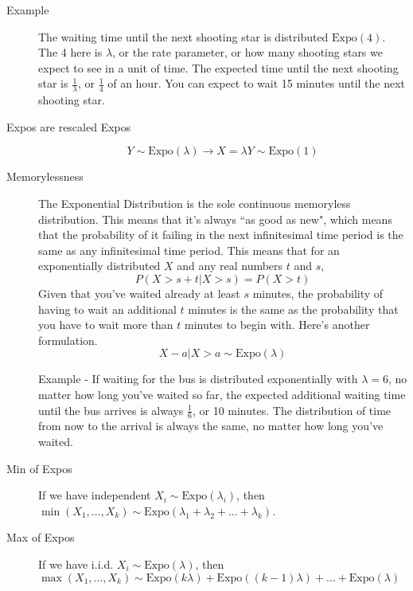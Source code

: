 \documentclass[10pt,landscape]{article}
\newcommand{\Expo}{\textrm{Expo}}
\begin{document}
\begin{multicols}{3}
\begin{description}
    \item[Example] The waiting time until the next shooting star is distributed $\Expo(4)$. The 4 here is $\lambda$, or the rate parameter, or how many shooting stars we expect to see in a unit of time. The expected time until the next shooting star is $\frac{1}{\lambda}$, or $\frac{1}{4}$ of an hour. You can expect to wait 15 minutes until the next shooting star.
    
    \item[Expos are rescaled Expos]
        \[Y \sim \Expo(\lambda) \rightarrow X = \lambda Y \sim \Expo(1)\]
     
    
    \item[Memorylessness] The Exponential Distribution is the sole continuous memoryless distribution. This means that it's always ``as good as new", which means that the probability of it failing in the next infinitesimal time period is the same as any infinitesimal time period. This means that for an exponentially distributed $X$ and any real numbers $t$ and $s$,
    \[P(X > s + t | X > s) = P(X > t)\]
    Given that you've waited already at least $s$ minutes, the probability of having to wait an additional $t$ minutes is the same as the probability that you have to wait more than $t$ minutes to begin with. Here's another formulation.
    \[X - a | X > a \sim \Expo(\lambda)\]

    Example - If waiting for the bus is distributed exponentially with $\lambda = 6$, no matter how long you've waited so far, the expected additional waiting time until the bus arrives is always $\frac{1}{6}$, or 10 minutes. The distribution of time from now to the arrival is always the same, no matter how long you've waited.

    \item[Min of Expos] If we have independent $X_i \sim \Expo(\lambda_i)$, then $\min(X_1, \dots, X_k) \sim \Expo(\lambda_1 + \lambda_2 + \dots + \lambda_k)$. 
    \item[Max of Expos] If we have i.i.d. $X_i \sim \Expo(\lambda)$, then $\max(X_1, \dots, X_k) \sim \Expo(k\lambda) + \Expo((k-1)\lambda) + \dots + \Expo(\lambda)$
    

\end{description}


\end{multicols}
\end{document}
